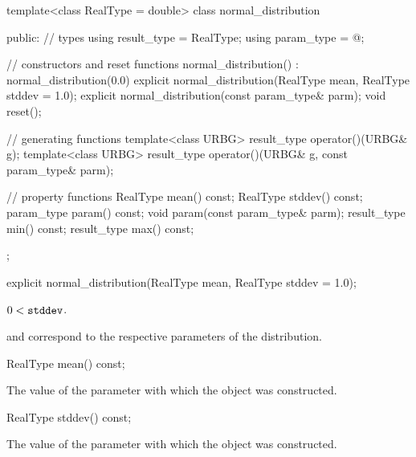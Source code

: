 %
%
\begin{codeblock}
template<class RealType = double>
  class normal_distribution {
  public:
    // types
    using result_type = RealType;
    using param_type  = @\unspec@;

    // constructors and reset functions
    normal_distribution() : normal_distribution(0.0) {}
    explicit normal_distribution(RealType mean, RealType stddev = 1.0);
    explicit normal_distribution(const param_type& parm);
    void reset();

    // generating functions
    template<class URBG>
      result_type operator()(URBG& g);
    template<class URBG>
      result_type operator()(URBG& g, const param_type& parm);

    // property functions
    RealType mean() const;
    RealType stddev() const;
    param_type param() const;
    void param(const param_type& parm);
    result_type min() const;
    result_type max() const;
  };
\end{codeblock}


%
\begin{itemdecl}
explicit normal_distribution(RealType mean, RealType stddev = 1.0);
\end{itemdecl}

\begin{itemdescr}
\pnum
\expects
$0 < \texttt{stddev}$.

\pnum
\remarks
{} and 
correspond to the respective parameters of the distribution.
\end{itemdescr}

%
\begin{itemdecl}
RealType mean() const;
\end{itemdecl}

\begin{itemdescr}
\pnum
\returns
The value of the  parameter
 with which the object was constructed.
\end{itemdescr}

%
\begin{itemdecl}
RealType stddev() const;
\end{itemdecl}

\begin{itemdescr}
\pnum
\returns
The value of the  parameter
 with which the object was constructed.
\end{itemdescr}


